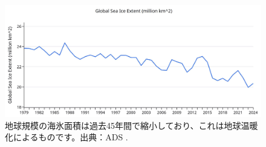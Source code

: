 \documentclass[10pt,twocolumn,letterpaper]{article}
\begin{document}
\begin{figure}[t]
\begin{center}
\includegraphics[width=1\textwidth]{ice.jpg}
\end{center}
   \caption{地球規模の海氷面積は過去45年間で縮小しており、これは地球温暖化によるものです。出典：ADS \cite{149}.}
\label{fig:24}
\end{figure}




\clearpage
\twocolumn

{\small
\renewcommand{\refname}{References}


}
\end{document}
